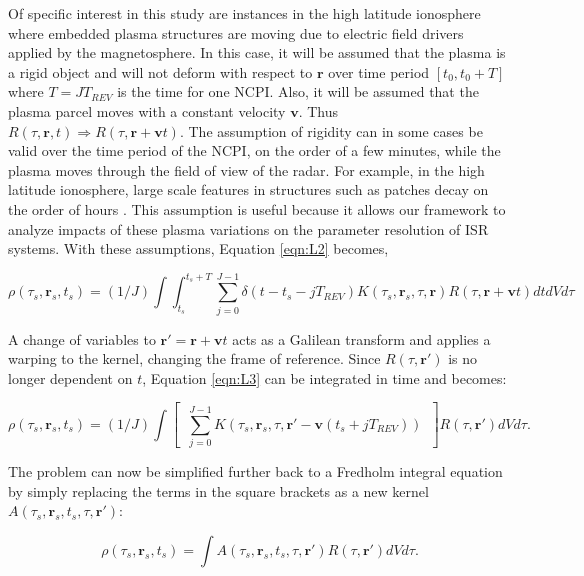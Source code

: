 Of specific interest in this study are instances in the high latitude ionosphere where embedded plasma structures are moving due to electric field drivers applied by the magnetosphere. In this case, it will be assumed that the plasma is a rigid object and will not deform with respect to $\mathbf{r}$ over time period $[t_0,t_0+T]$ where $T=JT_{REV}$ is the time for one NCPI. Also, it will be assumed that the plasma parcel moves with a constant velocity $\mathbf{v}$. Thus $R(\tau,\mathbf{r},t)\Rightarrow R(\tau,\mathbf{r}+\mathbf{v}t)$. The assumption of rigidity can in some cases be valid over the time period of the NCPI, on the order of a few minutes, while the plasma moves through the field of view of the radar. For example, in the high latitude ionosphere, large scale features in structures such as patches decay on the order of hours \citep{Tsunoda:1988ul}. This assumption is useful because it allows our framework to analyze impacts of these plasma variations on the parameter resolution of ISR systems. With these assumptions, Equation \ref{eqn:L2} becomes,

\begin{equation}
\label{eqn:L3}
\rho(\tau_s,\mathbf{r}_s,t_s) =(1/J) \int \int_{t_s}^{t_s+T} \displaystyle \sum_{j=0}^{J-1}\delta(t-t_s-jT_{REV}) K(\tau_s,\mathbf{r}_s,\tau,\mathbf{r})R(\tau,\mathbf{r}+\mathbf{v}t)dtdVd\tau\end{equation}

A change of variables to $\mathbf{r}' = \mathbf{r}+\mathbf{v}t$ acts as a Galilean transform and applies a warping to the kernel, changing the frame of reference. Since $R(\tau,\mathbf{r}')$ is no longer dependent on $t$, Equation \ref{eqn:L3} can be integrated in time and becomes:

\begin{equation}
\label{eqn:L5}
\rho(\tau_s,\mathbf{r}_s,t_s)= (1/J)\int \left[ \;\;  \displaystyle \sum_{j=0}^{J-1} K(\tau_s,\mathbf{r}_s,\tau,\mathbf{r}'-\mathbf{v}(t_s+jT_{REV})) \;\; \right]R(\tau,\mathbf{r}')dVd\tau.
\end{equation}

The problem can now be simplified further back to a Fredholm integral equation by simply replacing the terms in the square brackets as a new kernel $A(\tau_s,\mathbf{r}_s,t_s,\tau,\mathbf{r}')$:

\begin{equation}
\label{eqn:L6}
\rho(\tau_s,\mathbf{r}_s,t_s)= \int A(\tau_s,\mathbf{r}_s,t_s,\tau,\mathbf{r}') R(\tau,\mathbf{r}')dVd\tau.
\end{equation}

